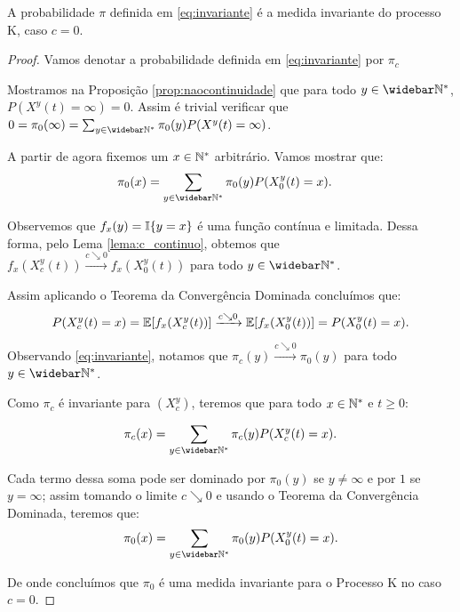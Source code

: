 \begin{proposicao}
  A probabilidade $\pi$ definida em \eqref{eq:invariante} é a medida
  invariante do processo K, caso $c = 0$.
\end{proposicao}
\begin{proof}

  Vamos denotar a probabilidade definida em \eqref{eq:invariante} por
  $\pi_c$

  Mostramos na Proposição \ref{prop:naocontinuidade} que para todo $y
  \in \Nzb$, $P(X^y(t) = \infty) = 0$. Assim é trivial verificar que
  $0 = \pi_0(\infty) = \sum_{y\in\Nzb} \pi_0(y) P(X^y(t) =
  \infty)$.

  A partir de agora fixemos um $x \in {\mathbb{N^*}}$ arbitrário. Vamos mostrar que:
  \begin{align*}
    \pi_0(x) &= \sum_{y \in \Nzb} \pi_0 (y) P(X^y_0 (t) = x).
  \end{align*}

  Observemos que $f_x(y) = {\mathbb{I}}\{y = x\}$ é uma função contínua e
  limitada. Dessa forma, pelo Lema \ref{lema:c_continuo}, obtemos que
  $f_x(X^y_c(t)) \xrightarrow{c\searrow 0} f_x(X^y_0(t))$ \qc para
  todo $y\in\Nzb$.


  Assim aplicando o Teorema da Convergência Dominada concluímos que:
  \begin{displaymath}
    P(X^y_c (t) = x) = {\mathbb{E}} [f_x(X^y_c(t))]
    \xrightarrow{c\searrow0}
    {\mathbb{E}} [f_x(X^y_0(t))] = P(X^y_0(t) = x).
  \end{displaymath}

  Observando \eqref{eq:invariante}, notamos que $\pi_c(y)
  \xrightarrow{c\searrow 0} \pi_0(y)$ para todo $y \in \Nzb$.

  Como $\pi_c$ é invariante para $(X^y_c)$, teremos que para todo $x
  \in {\mathbb{N^*}}$ e $t \geq 0$:

  \begin{align*}
    \pi_c(x) &= \sum_{y \in \Nzb} \pi_c (y) P(X^y_c (t) = x).\\
  \end{align*}


  Cada termo dessa soma pode ser dominado por $\pi_0(y)$ se $y \neq
  \infty$ e por $1$ se $y = \infty$; assim tomando o limite
  $c\searrow0$ e usando o Teorema da Convergência Dominada, teremos
  que:
  \begin{align*}
    \pi_0(x) &= \sum_{y \in \Nzb} \pi_0 (y) P(X^y_0 (t) = x).\\
  \end{align*}

  De onde concluímos que $\pi_0$ é uma medida invariante para o
  Processo K no caso $c = 0$.
\end{proof}


